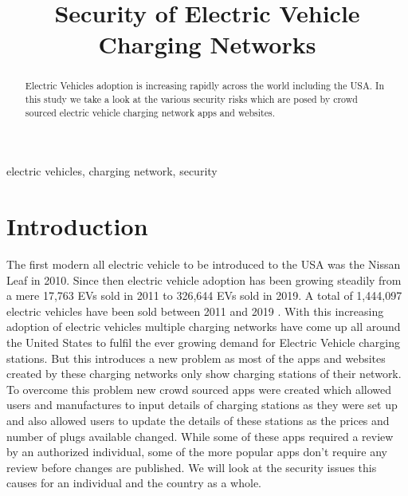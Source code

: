\documentclass[conference]{IEEEtran}
\begin{document}
\title{Security of Electric Vehicle Charging Networks\\
}

\author{
\and
{}
}

\maketitle

\begin{abstract}
Electric Vehicles adoption is increasing rapidly across the world including the USA. In this study we take a look at the various security risks which are posed by crowd sourced electric vehicle charging network apps and websites.
\end{abstract}

\begin{IEEEkeywords}
electric vehicles, charging network, security
\end{IEEEkeywords}

\section{Introduction}
The first modern all electric vehicle to be introduced to the USA was the Nissan Leaf in 2010. Since then electric vehicle adoption has been growing steadily from a mere 17,763 EVs sold in 2011 to 326,644 EVs sold in 2019. A total of 1,444,097 electric vehicles have been sold between 2011 and 2019 \cite{b1}. With this increasing adoption of electric vehicles multiple charging networks have come up all around the United States to fulfil the ever growing demand for Electric Vehicle charging stations. But this introduces a new problem as most of the apps and websites created by these charging networks only show charging stations of their network. To overcome this problem new crowd sourced apps were created which allowed users and manufactures to input details of charging stations as they were set up and also allowed users to update the details of these stations as the prices and number of plugs available changed. While some of these apps required a review by an authorized individual, some of the more popular apps don’t require any review before changes are published. We will look at the security issues this causes for an individual and the country as a whole. 
\end{document}
